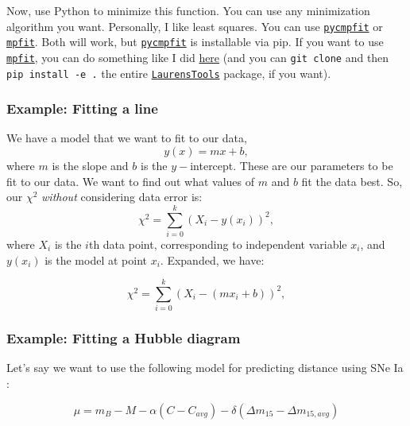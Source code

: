 Now, use Python to minimize this function. You can use any minimization algorithm you want. Personally, I like least squares. You can use \href{https://github.com/cosmonaut/pycmpfit}{\texttt{pycmpfit}} or \href{https://github.com/segasai/astrolibpy/blob/master/mpfit/mpfit.py}{\texttt{mpfit}}. Both will work, but \href{https://github.com/cosmonaut/pycmpfit}{\texttt{pycmpfit}} is installable via pip. If you want to use \href{https://github.com/segasai/astrolibpy/blob/master/mpfit/mpfit.py}{\texttt{mpfit}}, you can do something like I did \href{https://github.com/laldoroty/LaurensTools/tree/main/LaurensTools/mpfit}{here} (and you can \texttt{git clone} and then \texttt{pip install -e .} the entire \href{https://github.com/laldoroty/LaurensTools}{\texttt{LaurensTools}} package, if you want).

\subsubsection{Example: Fitting a line}

We have a model that we want to fit to our data,
\begin{equation}
    y(x) = mx + b,
\end{equation}
where $m$ is the slope and $b$ is the $y-$intercept. These are our parameters to be fit to our data. We want to find out what values of $m$ and $b$ fit the data best. So, our $\chi^{2}$ \textit{without} considering data error is:
\begin{equation}
    \chi^{2} = \sum_{i=0}^{k} (X_{i} - y(x_{i}))^{2},
\end{equation}
where $X_{i}$ is the $i$th data point, corresponding to independent variable $x_{i}$, and $y(x_{i})$ is the model at point $x_{i}$. Expanded, we have:

\begin{equation}
    \chi^{2} = \sum_{i=0}^{k} (X_{i} - (mx_{i} + b))^{2},
\end{equation}

\subsubsection{Example: Fitting a Hubble diagram}

Let's say we want to use the following model for predicting distance using SNe Ia \cite{tripp1998}:

\begin{equation}
    \mu = m_{B} - M - \alpha(C - C_{avg})- \delta(\Delta m_{15} - \Delta m_{15, avg})
\end{equation}